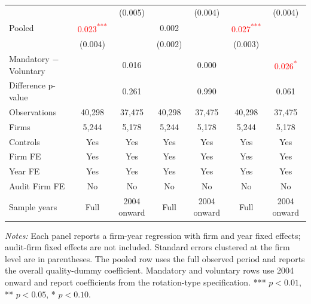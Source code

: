 \documentclass[10pt]{article}
\newcommand{\sym}[1]{\textsuperscript{#1}}
\begin{document}
\begin{minipage}{19cm}
\begin{threeparttable}
\begin{tabular}{l cc cc cc}
 &  & (0.005) &  & (0.004) &  & (0.004) \\
Pooled & \textcolor{red}{0.023\sym{***}} &  & 0.002 &  & \textcolor{red}{0.027\sym{***}} &  \\
 & (0.004) &  & (0.002) &  & (0.003) &  \\
Mandatory $-$ Voluntary &  & 0.016 &  & 0.000 &  & \textcolor{red}{0.026\sym{*}} \\
Difference p-value &  & 0.261 &  & 0.990 &  & 0.061 \\
Observations & 40,298 & 37,475 & 40,298 & 37,475 & 40,298 & 37,475 \\
Firms & 5,244 & 5,178 & 5,244 & 5,178 & 5,244 & 5,178 \\
\midrule
Controls & Yes & Yes & Yes & Yes & Yes & Yes \\
Firm FE & Yes & Yes & Yes & Yes & Yes & Yes \\
Year FE & Yes & Yes & Yes & Yes & Yes & Yes \\
Audit Firm FE & No & No & No & No & No & No \\
Sample years & Full & 2004 onward & Full & 2004 onward & Full & 2004 onward \\
\bottomrule
\end{tabular}
\begin{tablenotes}\fontsize{9}{11}\selectfont
\item \fontsize{9}{11}\selectfont \textit{Notes:} Each panel reports a firm-year regression with firm and year fixed effects; audit-firm fixed effects are not included. Standard errors clustered at the firm level are in parentheses. The pooled row uses the full observed period and reports the overall quality-dummy coefficient. Mandatory and voluntary rows use 2004 onward and report coefficients from the rotation-type specification. *** \(p<0.01\), ** \(p<0.05\), * \(p<0.10\).
\end{tablenotes}
\end{threeparttable}

\end{minipage}
\end{document}
